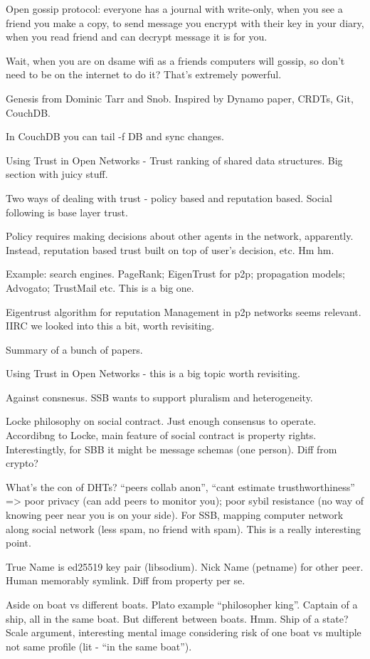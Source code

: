 \documentclass[12pt]{report}
\begin{document}
Open gossip protocol: everyone has a journal with write-only, when you see a
friend you make a copy, to send message you encrypt with their key in your
diary, when you read friend and can decrypt message it is for you.

Wait, when you are on dsame wifi as a friends computers will gossip, so don't
need to be on the internet to do it? That's extremely powerful.

Genesis from Dominic Tarr and Snob. Inspired by Dynamo paper, CRDTs, Git, CouchDB.

In CouchDB you can tail -f DB and sync changes.

Using Trust in Open Networks - Trust ranking of shared data structures. Big
section with juicy stuff.

Two ways of dealing with trust - policy based and reputation based. Social
following is base layer trust.

Policy requires making decisions about other agents in the network, apparently.
Instead, reputation based trust built on top of user's decision, etc. Hm hm.

Example: search engines. PageRank; EigenTrust for p2p; propagation models;
Advogato; TrustMail etc. This is a big one.

Eigentrust algorithm for reputation Management in p2p networks seems relevant.
IIRC we looked into this a bit, worth revisiting.

Summary of a bunch of papers. 

Using Trust in Open Networks - this is a big topic worth revisiting.

Against consnesus. SSB wants to support pluralism and heterogeneity.

Locke philosophy on social contract. Just enough consensus to operate.
Accordibng to Locke, main feature of social contract is property rights.
Interestingtly, for SBB it might be message schemas (one person). Diff from
crypto?

What's the con of DHTs? ``peers collab anon'', ``cant estimate
trusthworthiness'' => poor privacy (can add peers to monitor you); poor sybil
resistance (no way of knowing peer near you is on your side). For SSB, mapping
computer network along social network (less spam, no friend with spam). This is
a really interesting point.

True Name is ed25519 key pair (libsodium). Nick Name (petname) for other peer.
Human memorably symlink. Diff from property per se.

Aside on boat vs different boats. Plato example ``philosopher king''. Captain of
a ship, all in the same boat. But different between boats. Hmm. Ship of a state?
Scale argument, interesting mental image considering risk of one boat vs
multiple not same profile (lit - ``in the same boat'').
\end{document}
